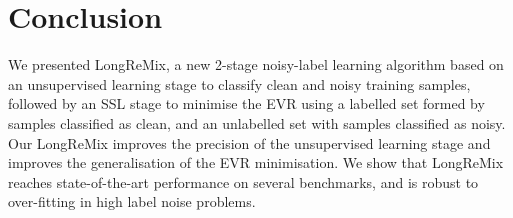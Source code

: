 \documentclass{article}
\begin{document}
\section{Conclusion}

We presented LongReMix, 
a new 2-stage noisy-label learning algorithm based on an unsupervised learning stage to classify clean and noisy training samples, followed by an SSL stage to minimise the EVR using a labelled set formed by samples classified as clean, and an unlabelled set with samples classified as noisy.
Our LongReMix improves the precision of the unsupervised learning stage and improves the generalisation of the EVR minimisation.
We show that LongReMix reaches state-of-the-art performance on several benchmarks, and is robust to over-fitting in high label noise problems.










\end{document}
